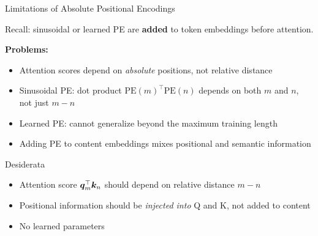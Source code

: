 
\begin{frame}{Limitations of Absolute Positional Encodings}

  Recall: sinusoidal or learned PE are \textbf{added} to token embeddings before attention.

  \vspace{0.5em}
  \textbf{Problems:}
  \begin{itemize}
    \item Attention scores depend on \emph{absolute} positions, not relative distance
    \item Sinusoidal PE: dot product $\text{PE}(m)^\top \text{PE}(n)$ depends on both $m$ and $n$, not just $m - n$
    \item Learned PE: cannot generalize beyond the maximum training length
    \item Adding PE to content embeddings mixes positional and semantic information
  \end{itemize}

  \vspace{0.5em}
  \begin{alertblock}{Desiderata}
    \begin{itemize}
      \item Attention score ${\boldsymbol{q}}_m^\top {\boldsymbol{k}}_n$ should depend on relative distance $m - n$
      \item Positional information should be \emph{injected into} Q and K, not added to content
      \item No learned parameters
    \end{itemize}
  \end{alertblock}

\end{frame}

